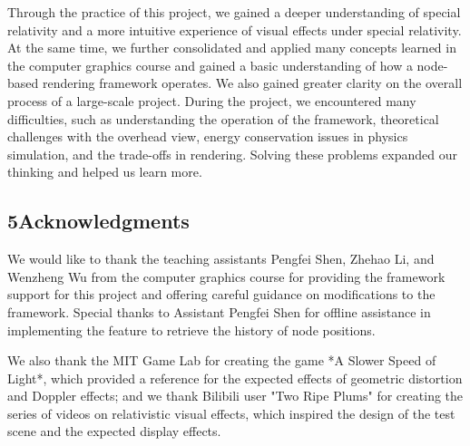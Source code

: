 \documentclass{article}
\begin{document}
Through the practice of this project, we gained a deeper understanding of special relativity and a more intuitive experience of visual effects under special relativity. At the same time, we further consolidated and applied many concepts learned in the computer graphics course and gained a basic understanding of how a node-based rendering framework operates. We also gained greater clarity on the overall process of a large-scale project. During the project, we encountered many difficulties, such as understanding the operation of the framework, theoretical challenges with the overhead view, energy conservation issues in physics simulation, and the trade-offs in rendering. Solving these problems expanded our thinking and helped us learn more.

\subsection*{5\quad Acknowledgments}

We would like to thank the teaching assistants Pengfei Shen, Zhehao Li, and Wenzheng Wu from the computer graphics course for providing the framework support for this project and offering careful guidance on modifications to the framework. Special thanks to Assistant Pengfei Shen for offline assistance in implementing the feature to retrieve the history of node positions.

We also thank the MIT Game Lab for creating the game *A Slower Speed of Light*, which provided a reference for the expected effects of geometric distortion and Doppler effects; and we thank Bilibili user "Two Ripe Plums" for creating the series of videos on relativistic visual effects, which inspired the design of the test scene and the expected display effects.

\label{unknown}
\end{document}
